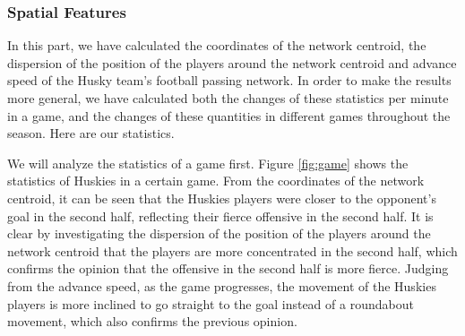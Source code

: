 \documentclass{mcmthesis}
\begin{document}
\subsubsection{Spatial Features}
	In this part, we have calculated the coordinates of the network centroid, the dispersion of the position of the players around the network centroid and advance speed of the Husky team's football passing network.  In order to make the results more general, we have calculated both the changes of these statistics per minute in a game, and the changes of these quantities in different games throughout the season.  Here are our statistics.

	We will analyze the statistics of a game first. Figure \ref{fig:game} shows the statistics of Huskies in a certain game.  From the coordinates of the network centroid, it can be seen that the Huskies players were closer to the opponent's goal in the second half, reflecting their fierce offensive in the second half.  It is clear by investigating the dispersion of the position of the players around the network centroid that the players are more concentrated in the second half, which confirms the opinion that the offensive in the second half is more fierce.  Judging from the advance speed, as the game progresses, the movement of the Huskies players is more inclined to go straight to the goal instead of a roundabout movement, which also confirms the previous opinion.
\end{document}
